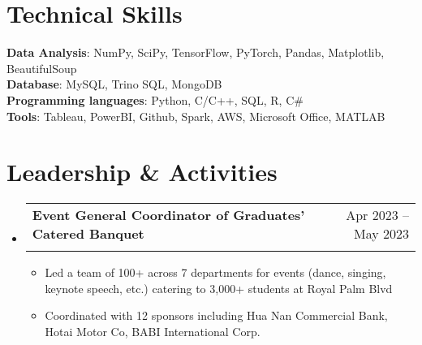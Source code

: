 \documentclass[letterpaper,11pt]{article}
\makeatletter
\newcommand{\resumeItem}[1]{
  \item\small{
    {#1 \vspace{-2pt}}
  }
}
\newcommand{\resumeSubheading}[4]{
  \vspace{-2pt}\item
    \begin{tabular*}{0.97\textwidth}[t]{l@{\extracolsep{\fill}}r}
      \textbf{#1} & #2 \\
      \textit{\small#3} & \textit{\small #4} \\
    \end{tabular*}\vspace{-7pt}
}
\newcommand{\resumeSubHeadingListStart}{\begin{itemize}[leftmargin=0.15in, label={}]}
\newcommand{\resumeSubHeadingListEnd}{\end{itemize}}
\newcommand{\resumeItemListStart}{\begin{itemize}}
\newcommand{\resumeItemListEnd}{\end{itemize}\vspace{-5pt}}
\makeatother
\begin{document}
\section{Technical Skills}
 \begin{itemize}[leftmargin=0.15in, label={}]
    \small{\item{
     \textbf{Data Analysis}{: NumPy, SciPy, TensorFlow, PyTorch, Pandas, Matplotlib, BeautifulSoup} \\      \textbf{Database}{: MySQL, Trino SQL, MongoDB} \\      \textbf{Programming languages}{: Python, C/C++, SQL, R, C\#} \\      \textbf{Tools}{: Tableau, PowerBI, Github, Spark, AWS, Microsoft Office, MATLAB}
    }}
 \end{itemize}

\section{Leadership \& Activities}
  \resumeSubHeadingListStart
    \resumeSubheading
      {\textbf{Event General Coordinator of Graduates' Catered Banquet}}{Apr 2023 -- May 2023}
      {}{}
      \resumeItemListStart
        \resumeItem{Led a team of 100+ across 7 departments for events (dance, singing, keynote speech, etc.) catering to 3,000+ students at Royal Palm Blvd}
        \resumeItem{Coordinated with 12 sponsors including Hua Nan Commercial Bank, Hotai Motor Co, BABI International Corp.}
      \resumeItemListEnd
  \resumeSubHeadingListEnd
\end{document}
